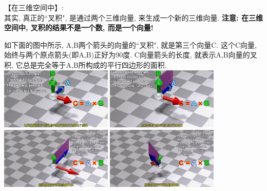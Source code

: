 \documentclass[UTF8]{ctexart}
\begin{document}
【在三维空间中】:\\
其实, 真正的``叉积", 是通过两个三维向量, 来生成一个新的三维向量. \textbf{注意: 在三维空间中, 叉积的结果不是一个数, 而是一个向量!} \\

\begin{myEnvSample}
	如下面的图中所示, A,B两个箭头的向量的``叉积", 就是第三个向量C. 这个C向量, 始终与两个原点箭头(即A,B)正好为90度.  C向量箭头的长度, 就表示A,B向量的叉积, 它总是完全等于A,B所构成的平行四边形的面积.\\

	\includegraphics[width=0.4\textwidth]{img/0076.png}
	\includegraphics[width=0.4\textwidth]{img/0077.png}\\
	\includegraphics[width=0.4\textwidth]{img/0078.png}
	\includegraphics[width=0.4\textwidth]{img/0079.png}\\
\end{myEnvSample}
\end{document}
